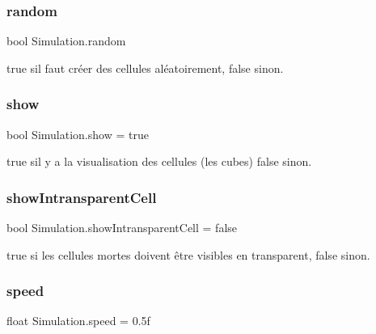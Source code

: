 \subsubsection{\texorpdfstring{random}{random}}
{\footnotesize\ttfamily bool Simulation.\+random\hspace{0.3cm}{\ttfamily [private]}}



true s\textquotesingle{}il faut créer des cellules aléatoirement, false sinon. 

\mbox{\label{class_simulation_ae9871215c90d09d1137f2332762dbbac}} 
\subsubsection{\texorpdfstring{show}{show}}
{\footnotesize\ttfamily bool Simulation.\+show = true\hspace{0.3cm}{\ttfamily [private]}}



true s\textquotesingle{}il y a la visualisation des cellules (les cubes) false sinon. 

\mbox{\label{class_simulation_a435bb7cb51e9dcf9f05a233e733ce451}} 
\subsubsection{\texorpdfstring{show\+Intransparent\+Cell}{showIntransparentCell}}
{\footnotesize\ttfamily bool Simulation.\+show\+Intransparent\+Cell = false\hspace{0.3cm}{\ttfamily [private]}}



true si les cellules mortes doivent être visibles en transparent, false sinon. 

\mbox{\label{class_simulation_a4e347114640730fa13c37ef9aa295d5c}} 
\subsubsection{\texorpdfstring{speed}{speed}}
{\footnotesize\ttfamily float Simulation.\+speed = 0.\+5f\hspace{0.3cm}{\ttfamily [private]}}



